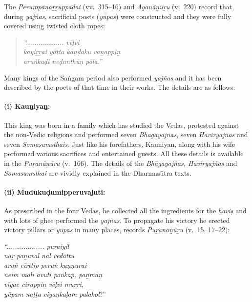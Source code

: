 The \textit{Perumpāṇāṟṟuppaḍai} (vv.~315–16) and \textit{Aganāṉūṟu} (v.~220) record that, during \textit{yajñas}, sacrificial posts (\textit{yūpas}) were constructed and they were fully covered using twisted cloth ropes:

\begin{quote}
\textit{“.................. vēḷvi}\\\textit{kayiṟṟai yātta kāṇḍaku vaṉappiṉ}\\\textit{aruṅkaḍi neḍunthūṇ pōla.}”
\end{quote}

Many kings of the Saṅgam period also performed \textit{yajñas} and it has been described by the poets of that time in their works. The details are as follows:

\paragraph*{(i) Kauṉiyaṉ:}

\vskip -7pt

This king was born in a family which has studied the Vedas, protested against the non-Vedic religions and performed seven \textit{Bhāgayajñas}, seven \textit{Haviryajñas} and seven \textit{Somasamsthais}. Just like his forefathers, Kauṉiyaṉ, along with his wife performed various sacrifices and entertained guests. All these details is available in the \textit{Puṟanāṉūṟu} (v.~166). The details of the \textit{Bhāgayajñas, Haviryajñas} and \textit{Somasamsthai} are vividly explained in the Dharmasūtra texts.


\paragraph*{(ii) Mudukuḍumipperuvaḻuti:}

\vskip -7pt

As prescribed in the four Vedas, he collected all the ingredients for the \textit{haviṣ} and with lots of ghee performed the \textit{yajñas}. To propagate his victory he erected victory pillars or \textit{yūpas} in many places, records \textit{Puṟanāṉūṟu} (v.~15. 17–22):

\textit{“.................. puraiyil}\\\textit{naṟ paṉuval nāl vēdattu}\\\textit{aruñ cīrttip peruṅ kaṇṇuṟai}\\\textit{neim mali āvuti poṅkap, paṉmāṇ}\\\textit{vīyac ciṟappiṉ vēḷvi muṟṟi,}\\\textit{yūpam naṭṭa viyaṉkaḷam palakol}?”

